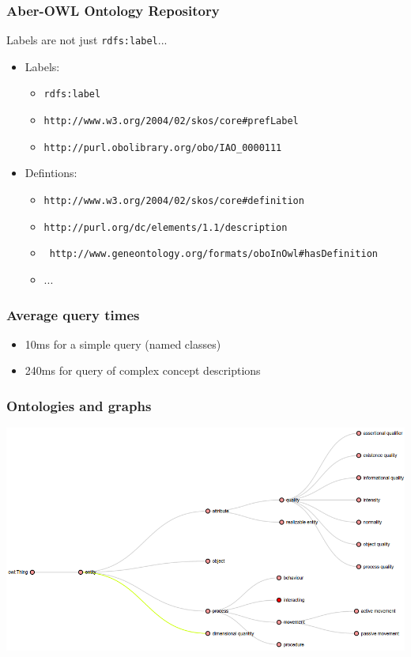 \documentclass{beamer}
\begin{document}
\begin{frame}
  \frametitle{Aber-OWL Ontology Repository}
  Labels are not just {\tt rdfs:label}...
  \begin{itemize}
  \item Labels:
    \begin{itemize}
    \item {\tt rdfs:label}
    \item {\tt http://www.w3.org/2004/02/skos/core\#prefLabel}
    \item {\tt http://purl.obolibrary.org/obo/IAO\_0000111}
    \end{itemize}
  \item Defintions:
    \begin{itemize}
    \item {\tt http://www.w3.org/2004/02/skos/core\#definition}
    \item {\tt http://purl.org/dc/elements/1.1/description}
    \item {\tt
        http://www.geneontology.org/formats/\-oboInOwl\#hasDefinition}
    \item ...
    \end{itemize}
  \end{itemize}
\end{frame}

\begin{frame}
  \frametitle{Average query times}
  \begin{itemize}
  \item 10ms for a simple query (named classes)
  \item 240ms for query of complex concept descriptions
  \end{itemize}
\end{frame}

\begin{frame}
  \frametitle{Ontologies and graphs}
  \centerline{\includegraphics[width=.9\textwidth]{sio.png}}
\end{frame}
\end{document}
